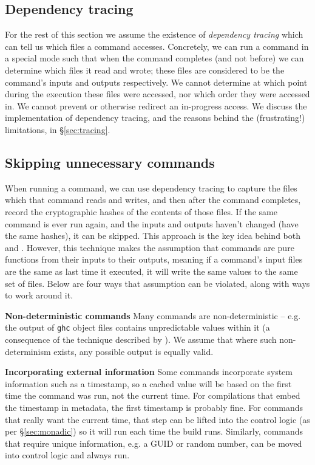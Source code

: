 \subsection{Dependency tracing}
\label{sec:assume_tracing}

For the rest of this section we assume the existence of \emph{dependency tracing} which can tell us which files a command accesses. Concretely, we can run a command in a special mode such that when the command completes (and not before) we can determine which files it read and wrote; these files are considered to be the command's inputs and outputs respectively. We cannot determine at which point during the execution these files were accessed, nor which order they were accessed in. We cannot prevent or otherwise redirect an in-progress access. We discuss the implementation of dependency tracing, and the reasons behind the (frustrating!) limitations, in \S\ref{sec:tracing}.

\subsection{Skipping unnecessary commands}
\label{sec:skipping_unnecessary}

When running a command, we can use dependency tracing to capture the files which that command reads and writes, and then after the command completes, record the cryptographic hashes of the contents of those files. If the same command is ever run again, and the inputs and outputs haven't changed (have the same hashes), it can be skipped. This approach is the key idea behind both \Memoize\cite{memoize} and \Fabricate\cite{fabricate}. However, this technique makes the assumption that commands are pure functions from their inputs to their outputs, meaning if a command's input files are the same as last time it executed, it will write the same values to the same set of files. Below are four ways that assumption can be violated, along with ways to work around it.

\textbf{Non-deterministic commands} Many commands are non-deterministic -- e.g. the output of \texttt{ghc} object files contains unpredictable values within it (a consequence of the technique described by \citet{lennart:unique_names}). We assume that where such non-determinism exists, any possible output is equally valid. %

\textbf{Incorporating external information} Some commands incorporate system information such as a timestamp, so a cached value will be based on the first time the command was run, not the current time. For compilations that embed the timestamp in metadata, the first timestamp is probably fine. For commands that really want the current time, that step can be lifted into the control logic (as per \S\ref{sec:monadic}) so it will run each time the build runs. Similarly, commands that require unique information, e.g. a GUID or random number, can be moved into control logic and always run.

